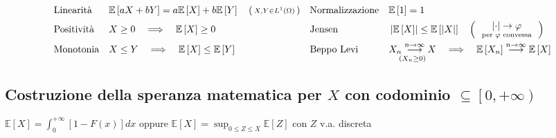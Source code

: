 \documentclass[a4paper,10pt]{article}
\theoremstyle{remark}
\theoremstyle{definition}
\begin{document}
\begin{align*}
 & \text{Linearità} &  & \mathbb{E}\left[aX+bY\right]=a\mathbb{E}\left[X\right]+b\mathbb{E}\left[Y\right]\quad\left(\begin{smallmatrix}X,Y\in L^{1}\left(\Omega\right)\end{smallmatrix}\right) &  & \text{Normalizzazione} &  & \mathbb{E}\left[1\right]=1\\
 & \text{Positività} &  & X\geq0\quad\Longrightarrow\quad\mathbb{E}\left[X\right]\geq0 &  & \text{Jensen} &  & \left|\mathbb{E}\left[X\right]\right|\leq\mathbb{E}\left[\left|X\right|\right]\quad\left(\begin{smallmatrix}\begin{array}{c}
\underset{\text{per \ensuremath{\varphi} convessa}}{\left|\cdot\right|\rightarrow\ensuremath{\varphi}}\end{array}\end{smallmatrix}\right)\\
 & \text{Monotonia} &  & X\leq Y\quad\Longrightarrow\quad\mathbb{E}\left[X\right]\leq\mathbb{E}\left[Y\right] &  & \text{Beppo Levi} &  & \underset{\left(X_{n}\geq0\right)}{X_{n}\overset{n\rightarrow\infty}{\longrightarrow}X}\quad\Longrightarrow\quad\mathbb{E}\left[X_{n}\right]\overset{n\rightarrow\infty}{\longrightarrow}\mathbb{E}\left[X\right]
\end{align*}


\subsection*{Costruzione della speranza matematica per $X$ con codominio $\subseteq\left[0,+\infty\right)$}

$\mathbb{E}\left[X\right]=\int_{0}^{+\infty}\left[1-F\left(x\right)\right]dx$
oppure $\mathbb{E}\left[X\right]=\sup_{0\leq Z\leq X}\mathbb{E}\left[Z\right]$
con $Z$ v.a. discreta
\end{document}
